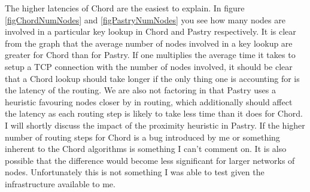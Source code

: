 \mbox{}

The higher latencies of Chord are the easiest to explain. In figure \ref{figChordNumNodes} and \ref{figPastryNumNodes} you see how many nodes are involved in a particular key lookup in Chord and Pastry respectively. It is clear from the graph that the average number of nodes involved in a key lookup are greater for Chord than for Pastry. If one multiplies the average time it takes to setup a TCP connection with the number of nodes involved, it should be clear that a Chord lookup should take longer if the only thing one is accounting for is the latency of the routing. We are also not factoring in that Pastry uses a heuristic favouring nodes closer by in routing, which additionally should affect the latency as each routing step is likely to take less time than it does for Chord. I will shortly discuss the impact of the proximity heuristic in Pastry.
If the higher number of routing steps for Chord is a bug introduced by me or something inherent to the Chord algorithms is something I can't comment on. It is also possible that the difference would become less significant for larger networks of nodes. Unfortunately this is not something I was able to test given the infrastructure available to me.


